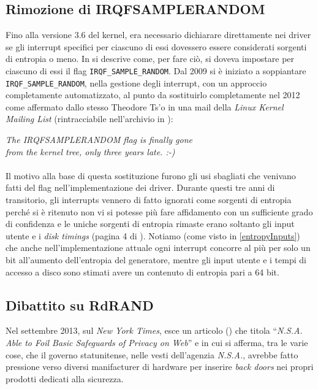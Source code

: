 \documentclass{article}
\begin{document}
 \subsection{Rimozione di IRQF\textunderscore{}SAMPLE\textunderscore{}RANDOM}
 \label{IRQFSAMPLERANDOM}
 Fino alla versione 3.6 del kernel, era necessario dichiarare direttamente nei
 driver se gli interrupt specifici per ciascuno di essi dovessero essere
 considerati sorgenti di entropia o meno. In \cite{lach} si descrive come, per
 fare ciò, si doveva impostare per ciascuno di essi il flag
 \verb+IRQF_SAMPLE_RANDOM+. Dal 2009 si è iniziato a soppiantare
 \verb+IRQF_SAMPLE_RANDOM+, nella gestione degli interrupt, con un approccio
 completamente automatizzato, al punto da sostituirlo completamente nel 2012
 come affermato dallo stesso Theodore Ts'o in una mail della \emph{Linux Kernel
 Mailing List} (rintracciabile nell'archivio in \cite{tso}):
 \begin{center}
 \emph{The 
 IRQF\textunderscore{}SAMPLE\textunderscore{}RANDOM flag is finally gone\\ from
 the kernel tree, only three years late.  :-)}
 \end{center}
 
 \paragraph{}Il motivo alla base di questa sostituzione furono gli usi
 sbagliati che venivano fatti del flag nell'implementazione dei driver. Durante
 questi tre anni di transitorio, gli interrupts vennero di fatto ignorati come
 sorgenti di entropia perché si è ritenuto non vi si potesse più fare
 affidamento con un sufficiente grado di confidenza e le uniche sorgenti di
 entropia rimaste erano soltanto gli input utente e i \emph{disk timings}
 (pagina 4 di \cite{lach}). Notiamo (come visto in \ref{entropyInputs}) che
 anche nell'implementazione attuale ogni interrupt concorre al più per solo un
 bit all'aumento dell'entropia del generatore, mentre gli input utente e i
 tempi di accesso a disco sono stimati avere un contenuto di entropia pari a 64
 bit.
 
 \subsection{Dibattito su RdRAND}\label{rdrand}
 Nel settembre 2013, sul \emph{New York Times}, esce un articolo (\cite{perl})
 che titola ``\emph{N.S.A. Able to Foil Basic Safeguards of Privacy on Web}'' e
 in cui si afferma, tra le varie cose, che il governo statunitense, nelle vesti
 dell'agenzia \emph{N.S.A.}, avrebbe fatto pressione verso diversi manifacturer
 di hardware per inserire \emph{back doors} nei propri prodotti dedicati alla
 sicurezza.
\end{document}
